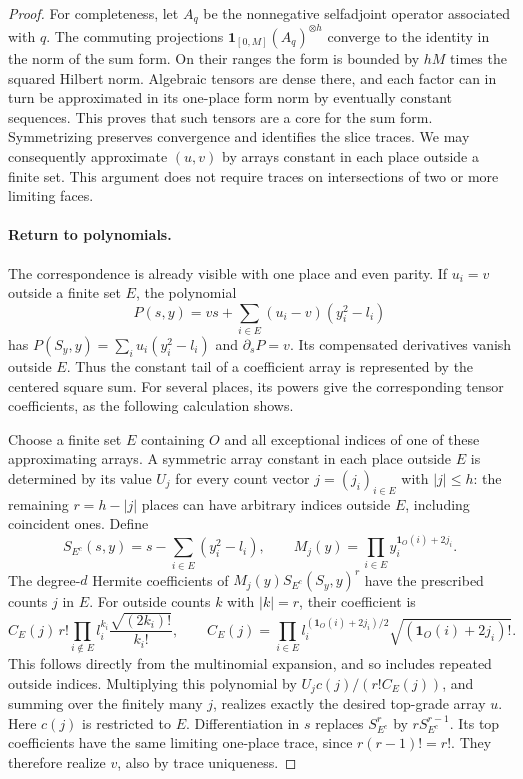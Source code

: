 \begin{proof}
For completeness, let $A_q$ be the nonnegative selfadjoint operator
associated with $q$. The commuting projections
$\mathbf1_{[0,M]}(A_q)^{\otimes h}$ converge to the identity in the
norm of the sum form. On their ranges the form is bounded by $hM$ times
the squared Hilbert norm. Algebraic tensors are dense there, and each
factor can in turn be approximated in its one-place form norm by
eventually constant sequences. This proves that such tensors are a
core for the sum form. Symmetrizing preserves convergence and identifies
the slice traces. We may consequently approximate $(u,v)$ by arrays
constant in each place outside a finite set. This argument does not
require traces on intersections of two or more limiting faces.

\paragraph{Return to polynomials.}
The correspondence is already visible with one place and even parity.
If $u_i=v$ outside a finite set $E$, the polynomial
\[
 P(s,y)=v s+\sum_{i\in E}(u_i-v)(y_i^2-l_i)
\]
has $P(S_y,y)=\sum_i u_i(y_i^2-l_i)$ and $\partial_sP=v$.
Its compensated derivatives vanish outside $E$. Thus the constant
tail of a coefficient array is represented by the centered square
sum. For several places, its powers give the corresponding tensor
coefficients, as the following calculation shows.

Choose a finite set $E$ containing $O$ and all exceptional indices of
one of these approximating arrays. A symmetric array constant in each
place outside $E$ is determined by its value $U_j$ for every count
vector $j=(j_i)_{i\in E}$ with $|j|\le h$: the remaining
$r=h-|j|$ places can have arbitrary indices outside $E$, including
coincident ones. Define
\[
 S_{E^c}(s,y)=s-\sum_{i\in E}(y_i^2-l_i),
 \qquad
 M_j(y)=\prod_{i\in E}y_i^{\mathbf1_O(i)+2j_i}.
\]
The degree-$d$ Hermite coefficients of
$M_j(y)S_{E^c}(S_y,y)^r$ have the prescribed counts $j$ in $E$.
For outside counts $k$ with $|k|=r$, their coefficient is
\[
 C_E(j)\,r!\prod_{i\notin E}
              l_i^{k_i}\frac{\sqrt{(2k_i)!}}{k_i!},
 \qquad
 C_E(j)=\prod_{i\in E}
       l_i^{(\mathbf1_O(i)+2j_i)/2}
       \sqrt{(\mathbf1_O(i)+2j_i)!}.
\]
This follows directly from the multinomial expansion, and so includes
repeated outside indices. Multiplying this polynomial by
$U_j c(j)/(r!C_E(j))$, and summing over the finitely many $j$, realizes
exactly the desired top-grade array $u$. Here $c(j)$ is restricted to
$E$. Differentiation in $s$ replaces $S_{E^c}^r$ by
$rS_{E^c}^{r-1}$. Its top coefficients have the same limiting one-place
trace, since $r(r-1)!=r!$. They therefore realize $v$, also by trace
uniqueness.


\end{proof}
